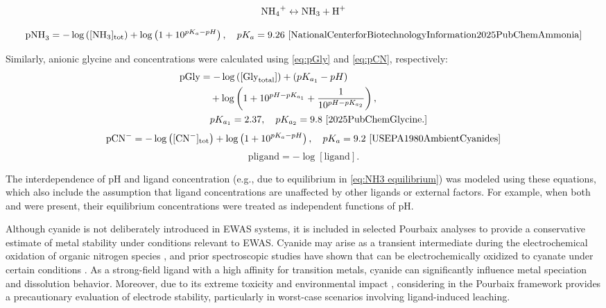 \documentclass[journal=jacsat,manuscript=article]{achemso}
\begin{document}
\begin{equation} \label{eq:NH3 equilibrium}
\ce{NH4+} \leftrightarrow \ce{NH3} + \ce{H+}
\end{equation}

\begin{equation} \label{eq:pNH3}
\text{pNH}_3 = -\log \left([\text{NH}_3]_{\text{tot}}\right) + \log \left(1 + 10^{pK_a - pH} \right), \quad pK_a = 9.26 \text{ \cite{NationalCenterforBiotechnologyInformation2025PubChemAmmonia}}
\end{equation}

Similarly, anionic glycine and  concentrations were calculated using \ref{eq:pGly} and \ref{eq:pCN}, respectively:
\begin{align} \label{eq:pGly}
\text{pGly} &= -\log \left([\text{Gly}_{\text{total}}]\right) + (pK_{a_1} - pH) \nonumber \\
&\quad + \log \left(1 + 10^{pH - pK_{a_1}} + \frac{1}{10^{pH - pK_{a_2}}} \right), \nonumber \\
&\quad pK_{a_1} = 2.37, \quad pK_{a_2} = 9.8 \text{ \cite{2025PubChemGlycine.}}
\end{align}
\begin{equation} \label{eq:pCN}
\text{pCN}^- = -\log \left([\text{CN}^-]_{\text{tot}}\right) + \log \left(1 + 10^{pK_a - pH} \right), \quad pK_a = 9.2 \text{ \cite{USEPA1980AmbientCyanides}}
\end{equation}
\begin{equation} \label{eq:pligand}
\text{pligand} = -\log[\text{ligand}].
\end{equation}

The interdependence of pH and ligand concentration (e.g., due to  equilibrium in \ref{eq:NH3 equilibrium}) was modeled using these equations, which also include the assumption that ligand concentrations are unaffected by other ligands or external factors. For example, when both  and  were present, their equilibrium concentrations were treated as independent functions of pH.


Although cyanide is not deliberately introduced in EWAS systems, it is included in selected Pourbaix analyses to provide a conservative estimate of metal stability under conditions relevant to EWAS. Cyanide may arise as a transient intermediate during the electrochemical oxidation of organic nitrogen species \cite{Oraby2020GoldPermanganate, Chen2013AdsorptionStudy, Huerta1997ElectrochemicalPt111, Sandoval2011AdsorptionStudy}, and prior spectroscopic studies have shown that  can be electrochemically oxidized to cyanate under certain conditions \cite{Paulissen1992InfraredConditions, Hinman1986FourierElectrodes, Kitamura1986OxidationSpectroscopy, Chen2013AdsorptionStudy}.
As a strong-field ligand with a high affinity for transition metals, cyanide can significantly influence metal speciation and dissolution behavior. Moreover, due to its extreme toxicity and environmental impact \cite{xing2018simple, mekuto2016integrated, bruger2018volatilisation}, considering  in the Pourbaix framework provides a precautionary evaluation of electrode stability, particularly in worst-case scenarios involving ligand-induced leaching.
\end{document}
